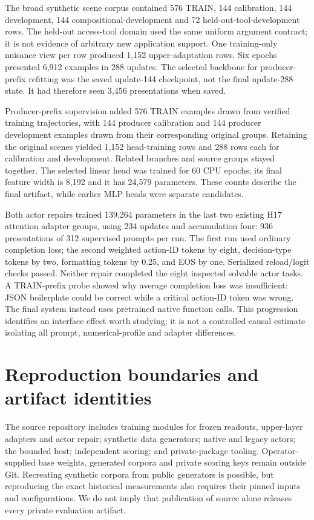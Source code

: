 \documentclass[11pt]{article}
\begin{document}
The broad synthetic scene corpus contained 576 TRAIN, 144 calibration, 144 development, 144 compositional-development and 72 held-out-tool-development rows. The held-out access-tool domain used the same uniform argument contract; it is not evidence of arbitrary new application support. One training-only nuisance view per row produced 1,152 upper-adaptation rows. Six epochs presented 6,912 examples in 288 updates. The selected backbone for producer-prefix refitting was the saved update-144 checkpoint, not the final update-288 state. It had therefore seen 3,456 presentations when saved.

Producer-prefix supervision added 576 TRAIN examples drawn from verified training trajectories, with 144 producer calibration and 144 producer development examples drawn from their corresponding original groups. Retaining the original scenes yielded 1,152 head-training rows and 288 rows each for calibration and development. Related branches and source groups stayed together. The selected linear head was trained for 60 CPU epochs; its final feature width is 8,192 and it has 24,579 parameters. These counts describe the final artifact, while earlier MLP heads were separate candidates.

Both actor repairs trained 139,264 parameters in the last two existing H17 attention adapter groups, using 234 updates and accumulation four: 936 presentations of 312 supervised prompts per run. The first run used ordinary completion loss; the second weighted action-ID tokens by eight, decision-type tokens by two, formatting tokens by 0.25, and EOS by one. Serialized reload/logit checks passed. Neither repair completed the eight inspected solvable actor tasks. A TRAIN-prefix probe showed why average completion loss was insufficient: JSON boilerplate could be correct while a critical action-ID token was wrong. The final system instead uses pretrained native function calls. This progression identifies an interface effect worth studying; it is not a controlled causal estimate isolating all prompt, numerical-profile and adapter differences.

\section{Reproduction boundaries and artifact identities}
The source repository includes training modules for frozen readouts, upper-layer adapters and actor repair; synthetic data generators; native and legacy actors; the bounded host; independent scoring; and private-package tooling. Operator-supplied base weights, generated corpora and private scoring keys remain outside Git. Recreating synthetic corpora from public generators is possible, but reproducing the exact historical measurements also requires their pinned inputs and configurations. We do not imply that publication of source alone releases every private evaluation artifact.
\end{document}
